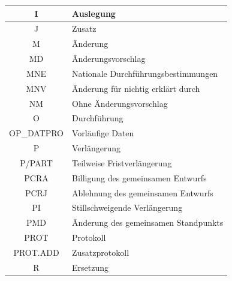 \begin{table}[h]
\begin{tabular}{|c|l|}
            I & Auslegung \\\hline
            J & Zusatz \\\hline
            M & Änderung \\\hline
            MD & Änderungsvorschlag \\\hline
            MNE & Nationale Durchführungsbestimmungen \\\hline
            MNV & Änderung für nichtig erklärt durch \\\hline
            NM & Ohne Änderungsvorschlag \\\hline
            O & Durchführung \\\hline
            OP\_DATPRO & Vorläufige Daten \\\hline
            P & Verlängerung \\\hline
            P/PART & Teilweise Fristverlängerung \\\hline
            PCRA & Billigung des gemeinsamen Entwurfs \\\hline
            PCRJ & Ablehnung des gemeinsamen Entwurfs \\\hline
            PI & Stillschweigende Verlängerung \\\hline
            PMD & Änderung des gemeinsamen Standpunkts \\\hline
            PROT & Protokoll \\\hline
            PROT.ADD & Zusatzprotokoll \\\hline
            R & Ersetzung \\\hline

\end{tabular}
\end{table}
